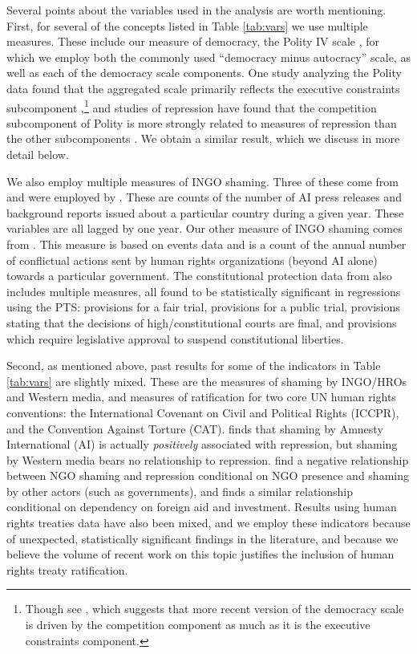 \documentclass[11pt]{article}
\begin{document}
Several points about the variables used in the analysis are worth mentioning. First, for several of the concepts listed in Table \ref{tab:vars} we use multiple measures. These include our measure of democracy, the Polity IV scale \citep{MarshallJaggers2009}, for which we employ both the commonly used ``democracy minus autocracy'' scale, as well as each of the democracy scale components. One study analyzing the Polity data found that the aggregated scale primarily reflects the executive constraints subcomponent \citep{GleditschWard1997},\footnote{Though see \citet{Jones2013polity}, which suggests that more recent version of the democracy scale is driven by the competition component as much as it is the executive constraints component.} and studies of repression have found that the competition subcomponent of Polity is more strongly related to measures of repression than the other subcomponents \citep{Keith2002PRQ, BDMetal2005}. We obtain a similar result, which we discuss in more detail below.  

We also employ multiple measures of INGO shaming. Three of these come from \citet{RonRamosRodgers2005} and were employed by \citet{HafnerBurton2008}. These are counts of the number of AI press releases and background reports issued about a particular country during a given year. These variables are all lagged by one year. Our other measure of INGO shaming comes from \citet{MurdieDavis2012}. This measure is based on events data and is a count of the annual number of conflictual actions sent by human rights organizations (beyond AI alone) towards a particular government. The constitutional protection data from \citet{KeithTatePoe2009} also includes multiple measures, all found to be statistically significant in regressions using the PTS: provisions for a fair trial, provisions for a public trial, provisions stating that the decisions of high/constitutional courts are final, and provisions which require legislative approval to suspend constitutional liberties. 

Second, as mentioned above, past results for some of the indicators in Table \ref{tab:vars} are slightly mixed. These are the measures of shaming by INGO/HROs and Western media, and measures of ratification for two core UN human rights conventions: the International Covenant on Civil and Political Rights (ICCPR), and the Convention Against Torture (CAT). \citet{HafnerBurton2008} finds that shaming by Amnesty International (AI) is actually {\it positively} associated with repression, but shaming by Western media bears no relationship to repression. \citet{MurdieDavis2012} find a negative relationship between NGO shaming and repression conditional on NGO presence and shaming by other actors (such as governments), and \citet{Franklin2008} finds a similar relationship conditional on dependency on foreign aid and investment. Results using human rights treaties data have also been mixed, and we employ these indicators because of unexpected, statistically significant findings in the literature, and because we believe the volume of recent work on this topic justifies the inclusion of human rights treaty ratification. 
\end{document}
